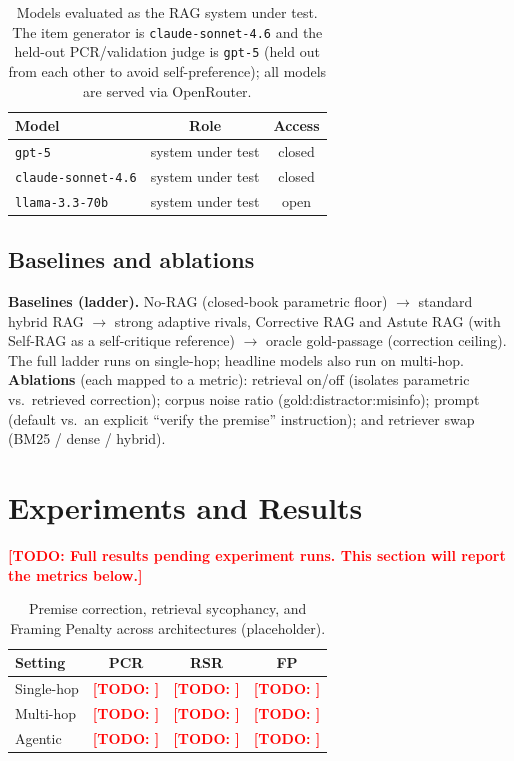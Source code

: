 \documentclass[11pt]{article}
\newcommand{\TODO}[1]{\textcolor{red}{\textbf{[TODO: #1]}}}
\begin{document}
\begin{table}[t]
  \centering
  \small
  \begin{tabular}{lcc}
    \toprule
    \textbf{Model} & \textbf{Role} & \textbf{Access} \\
    \midrule
    \texttt{gpt-5}             & system under test & closed \\
    \texttt{claude-sonnet-4.6} & system under test & closed \\
    \texttt{llama-3.3-70b}     & system under test & open \\
    \bottomrule
  \end{tabular}
  \caption{Models evaluated as the RAG system under test. The item generator is \texttt{claude-sonnet-4.6} and the held-out PCR/validation judge is \texttt{gpt-5} (held out from each other to avoid self-preference); all models are served via OpenRouter.}
  \label{tab:models}
\end{table}

\subsection{Baselines and ablations}
\textbf{Baselines (ladder).} No-RAG (closed-book parametric floor) $\rightarrow$ standard hybrid RAG $\rightarrow$ strong adaptive rivals, Corrective RAG \citep{yan2024crag} and Astute RAG \citep{wang2024astute} (with Self-RAG \citep{asai2024selfrag} as a self-critique reference) $\rightarrow$ oracle gold-passage (correction ceiling). The full ladder runs on single-hop; headline models also run on multi-hop. \textbf{Ablations} (each mapped to a metric): retrieval on/off (isolates parametric vs.\ retrieved correction); corpus noise ratio (gold:distractor:misinfo); prompt (default vs.\ an explicit ``verify the premise'' instruction); and retriever swap (BM25 / dense / hybrid).

\section{Experiments and Results}
\TODO{Full results pending experiment runs. This section will report the metrics below.}

\begin{table}[t]
  \centering
  \small
  \begin{tabular}{lccc}
    \toprule
    \textbf{Setting} & \textbf{PCR} & \textbf{RSR} & \textbf{FP} \\
    \midrule
    Single-hop & \TODO{} & \TODO{} & \TODO{} \\
    Multi-hop  & \TODO{} & \TODO{} & \TODO{} \\
    Agentic    & \TODO{} & \TODO{} & \TODO{} \\
    \bottomrule
  \end{tabular}
  \caption{Premise correction, retrieval sycophancy, and Framing Penalty across architectures (placeholder).}
  \label{tab:main}
\end{table}
\end{document}
